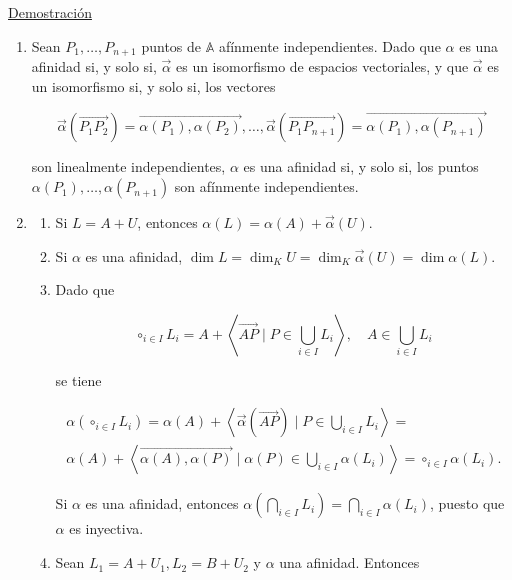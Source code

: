 \documentclass[12pt, a4paper, ones, notitlepage, openany,titlepage]{article}
\newcommand{\demostracion}{\noindent\underline{Demostración}}
\begin{document}
\demostracion 
\begin{enumerate}
	
	\item Sean $P_{1}, \ldots, P_{n+1}$ puntos de $\mathbb{A}$ afínmente independientes. Dado que $\alpha$ es una afinidad si, y solo si, $\vec{\alpha}$ es un isomorfismo de espacios vectoriales, y que $\vec{\alpha}$ es un isomorfismo si, y solo si, los vectores
	
	$$
	\vec{\alpha}\left(\overrightarrow{P_{1} P_{2}}\right)=\overrightarrow{\alpha\left(P_{1}\right), \alpha\left(P_{2}\right)}, \ldots, \vec{\alpha}\left(\overrightarrow{P_{1} P_{n+1}}\right)=\overrightarrow{\alpha\left(P_{1}\right), \alpha\left(P_{n+1}\right)}
	$$
	
	son linealmente independientes, $\alpha$ es una afinidad si, y solo si, los puntos $\alpha\left(P_{1}\right), \ldots, \alpha\left(P_{n+1}\right)$ son afínmente independientes.
	
	\item 
	\begin{enumerate}
		\item Si $L=A+U$, entonces $\alpha(L)=\alpha(A)+\vec{\alpha}(U)$.
		
		\item Si $\alpha$ es una afinidad, $\dim  L=\dim _{K} U=\dim _{K} \vec{\alpha}(U)=\dim  \alpha(L)$.
		
		\item Dado que
		
		$$
		\circ_{i \in I} L_{i}=A+\left\langle\overrightarrow{A P} \mid P \in \bigcup_{i \in I} L_{i}\right\rangle, \quad A \in \bigcup_{i \in I} L_{i}
		$$
		
		se tiene
		
		\begin{gather*}
			\alpha\left(\circ_{i \in I} L_{i}\right)=\alpha(A)+\left\langle\vec{\alpha}(\overrightarrow{A P}) \mid P \in \bigcup_{i \in I} L_{i}\right\rangle=\\
			\alpha(A)+\left\langle\overrightarrow{\alpha(A), \alpha(P)} \mid \alpha(P) \in \bigcup_{i \in I} \alpha\left(L_{i}\right)\right\rangle=\circ_{i \in I} \alpha\left(L_{i}\right) .
		\end{gather*}
		
		Si $\alpha$ es una afinidad, entonces $\alpha\left(\bigcap_{i \in I} L_{i}\right)=\bigcap_{i \in I} \alpha\left(L_{i}\right)$, puesto que $\alpha$ es inyectiva.
		
		\item Sean $L_{1}=A+U_{1}, L_{2}=B+U_{2}$ y $\alpha$ una afinidad. Entonces
		

\end{enumerate}
\end{enumerate}
\end{document}

